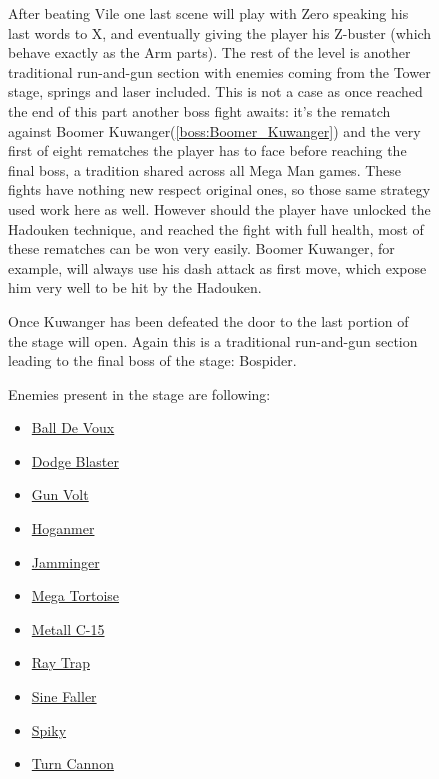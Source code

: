 \begin{figure}[htp]
After beating Vile one last scene will play with Zero speaking his last words to X, and eventually giving the player his Z-buster (which behave exactly as the Arm parts). The rest of the level is another traditional run-and-gun section with enemies coming from the Tower stage, springs and laser included. This is not a case as once reached the end of this part another boss fight awaits: it's the rematch against Boomer Kuwanger(\ref{boss:Boomer_Kuwanger}) and the very first of eight rematches the player has to face before reaching the final boss, a tradition shared across all Mega Man games. These fights have nothing new respect original ones, so those same strategy used work here as well. However should the player have unlocked the Hadouken technique, and reached the fight with full health, most of these rematches can be won very easily. Boomer Kuwanger, for example, will always use his dash attack as first move, which expose him very well to be hit by the Hadouken.

Once Kuwanger has been defeated the door to the last portion of the stage will open. Again this is a traditional run-and-gun section leading to the final boss of the stage: Bospider.

Enemies present in the stage are following\cite{wiki:sigma_stages}:
\begin{itemize}
	\item \hyperlink {enem:Ball_De_Voux}{Ball De Voux}
	\item \hyperlink {enem:Dodge_Blaster}{Dodge Blaster}
	\item \hyperlink {enem:Gun_Volt}{Gun Volt}
	\item \hyperlink {enem:Hoganmer}{Hoganmer}
	\item \hyperlink {enem:Jamminger}{Jamminger}
	\item \hyperlink {enem:Mega_Tortoise}{Mega Tortoise}
	\item \hyperlink {enem:Metall_C-15}{Metall C-15}
	\item \hyperlink {enem:Ray_Trap}{Ray Trap}
	\item \hyperlink {enem:Sine_Faller}{Sine Faller}
	\item \hyperlink {enem:Spiky}{Spiky}
	\item \hyperlink {enem:Turn_Cannon}{Turn Cannon}
\end{itemize}


\end{figure}
